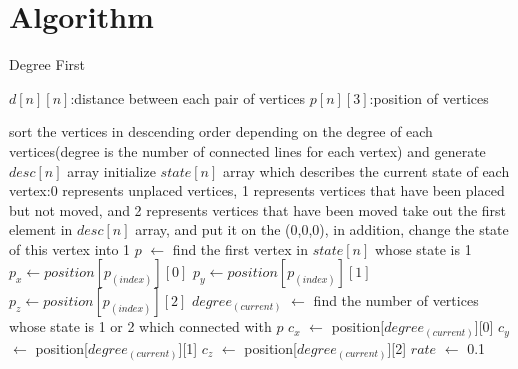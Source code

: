 \documentclass[runningheads]{llncs}
\begin{document}
\section{Algorithm}

    \begin{algorithm}
        \caption{Degree First}
        \begin{algorithmic}[1]
            \Require 
                $d[n][n]$:distance between each pair of vertices
            \Ensure
                $p[n][3]$:position of vertices
            
                \State sort the vertices in descending order depending on the degree of each vertices(degree is the number of connected lines for each vertex) and generate $desc[n]$ array
                \State initialize $state[n]$ array which describes the current state of each vertex:0 represents unplaced vertices, 1 represents vertices that have been placed but not moved, and 2 represents vertices that have been moved
                \State take out the first element in $desc[n]$ array, and put it on the (0,0,0), in addition, change the state of this vertex into 1
            \EndFunction
            \State
                    \State $p$ $\gets$ find the first vertex in $state[n]$ whose state is 1
                    \State $p_x \gets position[p_(index)][0]$
                    \State $p_y \gets position[p_(index)][1]$
                    \State $p_z \gets position[p_(index)][2]$
                    \State $degree_(current)$ $\gets$ find the number of vertices whose state is 1 or 2 which connected with $p$  
                            \State $c_x$ $\gets$ position[$degree_(current)$][0]
                            \State $c_y$ $\gets$ position[$degree_(current)$][1]
                            \State $c_z$ $\gets$ position[$degree_(current)$][2]
                            \State $rate$ $\gets$ 0.1
                            

\end{algorithmic}
\end{algorithm}
\end{document}
